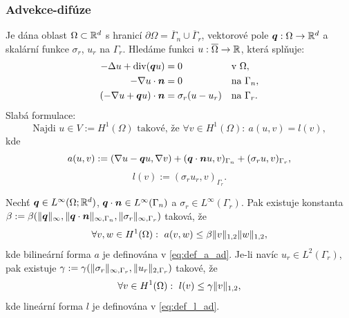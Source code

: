 \subsubsection{Advekce-difúze}

Je dána oblast $\Omega\subset\mathbb R^d$ s hranicí $\partial\Omega=\overline\Gamma_n\cup\overline\Gamma_r$, vektorové pole $\mathbf{\boldsymbol{q}}:\Omega\rightarrow\mathbb R^d$ a skalární funkce $\sigma_r$, $u_r$ na $\Gamma_r$.
Hledáme funkci $u:\overline\Omega\rightarrow\mathbb R$, která splňuje:
\[ \begin{aligned}
-\Delta u + \operatorname{div}(\mathbf{\boldsymbol{q}} u) &= 0 &&\text{v }\Omega,\\
-\nabla u \cdot \mathbf{\boldsymbol{n}} &= 0 &&\text{na }\Gamma_n,\\
(-\nabla u + \mathbf{\boldsymbol{q}} u) \cdot \mathbf{\boldsymbol{n}} &= \sigma_r(u - u_r) &&\text{na }\Gamma_r.
\end{aligned} \]
Slabá formulace:
\[ \mbox{Najdi }u\in V:=H^1(\Omega) \mbox{ takové, že }\forall v\in H^1(\Omega):~a(u,v)=l(v), \]
kde
\begin{equation}\label{eq:def_a_ad}
a(u,v) := (\nabla u-\mathbf{\boldsymbol{q}} u, \nabla v) + (\mathbf{\boldsymbol{q}}\cdot\mathbf{\boldsymbol{n}} u,v)_{\Gamma_n} + (\sigma_r u, v)_{\Gamma_r},
\end{equation}
\begin{equation}\label{eq:def_l_ad}
l(v) := (\sigma_r u_r, v)_{\Gamma_r}.
\end{equation}
% 
\begin{veta}
Nechť $\mathbf{\boldsymbol{q}}\in L^\infty(\Omega;\mathbb R^d)$, $\mathbf{\boldsymbol{q}}\cdot\mathbf{\boldsymbol{n}}\in L^\infty(\Gamma_n)$ a $\sigma_r\in L^\infty(\Gamma_r)$. Pak existuje konstanta $\beta:=\beta(\|\mathbf{\boldsymbol{q}}\|_\infty,\|\mathbf{\boldsymbol{q}}\cdot\mathbf{\boldsymbol{n}}\|_{\infty,\Gamma_n},\|\sigma_r\|_{\infty,\Gamma_r})$ taková, že
\[ \forall v,w\in H^1(\Omega):~a(v,w) \le \beta \|v\|_{1,2}\|w\|_{1,2}, \]
kde bilineární forma $a$ je definována v \eqref{eq:def_a_ad}.
Je-li navíc $u_r\in L^2(\Gamma_r)$, pak existuje $\gamma:=\gamma(\|\sigma_r\|_{\infty,\Gamma_r},\|u_r\|_{2,\Gamma_r})$ takové, že
\[ \forall v\in H^1(\Omega):~l(v) \le \gamma\|v\|_{1,2}, \]
kde lineární forma $l$ je definována v \eqref{eq:def_l_ad}.
\end{veta}
